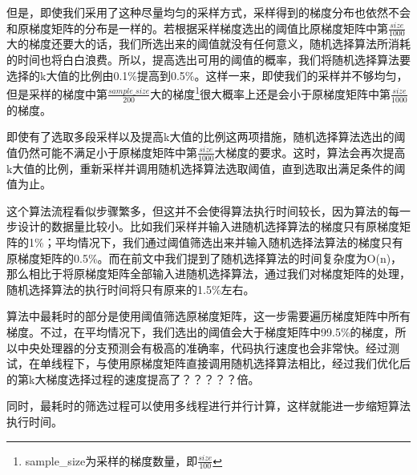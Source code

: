 但是，即使我们采用了这种尽量均匀的采样方式，采样得到的梯度分布也依然不会和原梯度矩阵的分布是一样的。若根据采样梯度选出的阈值比原梯度矩阵中第$\frac{size}{1000}$大的梯度还要大的话，我们所选出来的阈值就没有任何意义，随机选择算法所消耗的时间也将白白浪费。所以，提高选出可用的阈值的概率，我们将随机选择算法要选择的k大值的比例由0.1\%提高到0.5\%。这样一来，即使我们的采样并不够均匀，但是采样的梯度中第$\frac{sample\_size}{200}$大的梯度\footnote{sample\_size为采样的梯度数量，即$\frac{size}{100}$}很大概率上还是会小于原梯度矩阵中第$\frac{size}{1000}$的梯度。

即使有了选取多段采样以及提高k大值的比例这两项措施，随机选择算法选出的阈值仍然可能不满足小于原梯度矩阵中第$\frac{size}{1000}$大梯度的要求。这时，算法会再次提高k大值的比例，重新采样并调用随机选择算法选取阈值，直到选取出满足条件的阈值为止。

这个算法流程看似步骤繁多，但这并不会使得算法执行时间较长，因为算法的每一步设计的数据量比较小。比如我们采样并输入进随机选择算法的梯度只有原梯度矩阵的1\%；平均情况下，我们通过阈值筛选出来并输入随机选择法算法的梯度只有原梯度矩阵的0.5\%。而在前文中我们提到了随机选择算法的时间复杂度为O(n)，那么相比于将原梯度矩阵全部输入进随机选择算法，通过我们对梯度矩阵的处理，随机选择算法的执行时间将只有原来的1.5\%左右。

算法中最耗时的部分是使用阈值筛选原梯度矩阵，这一步需要遍历梯度矩阵中所有梯度。不过，在平均情况下，我们选出的阈值会大于梯度矩阵中99.5\%的梯度，所以中央处理器的分支预测会有极高的准确率，代码执行速度也会非常快。经过测试，在单线程下，与使用原梯度矩阵直接调用随机选择算法相比，经过我们优化后的第k大梯度选择过程的速度提高了？？？？？倍。

同时，最耗时的筛选过程可以使用多线程进行并行计算，这样就能进一步缩短算法执行时间。